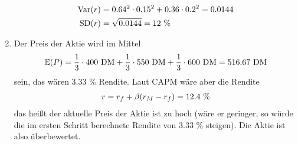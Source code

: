 \documentclass{article}
\newcommand{\E}{\mathbb{E}}
\DeclareMathOperator{\Var}{Var}
\DeclareMathOperator{\SD}{SD}
\begin{document}
\begin{enumerate}[label=(\alph*)]
		\begin{align}
			\Var(r) &= 0.64^2\cdot 0.15^2 + 0.36\cdot 0.2^2 = 0.0144 \notag \\
			\SD(r) &= \sqrt{0.0144} = 12\text{ \%} \notag
		\end{align}
		\item Der Preis der Aktie wird im Mittel
		\begin{align}
			\E(P) = \frac{1}{3}\cdot 400\text{ DM} + \frac{1}{3}\cdot 550\text{ DM} + \frac{1}{3}\cdot 600\text{ DM} = 516.67\text{ DM} \notag
		\end{align}
		sein, das wären 3.33 \% Rendite. Laut CAPM wäre aber die Rendite
		\begin{align}
			r = r_f + \beta(r_M-r_f) = 12.4\text{ \%} \notag
		\end{align}
		das heißt der aktuelle Preis der Aktie ist zu hoch (wäre er geringer, so würde die im ersten Schritt berechnete Rendite von 3.33 \% steigen). Die Aktie ist also überbewertet.
	\end{enumerate}
\end{document}
